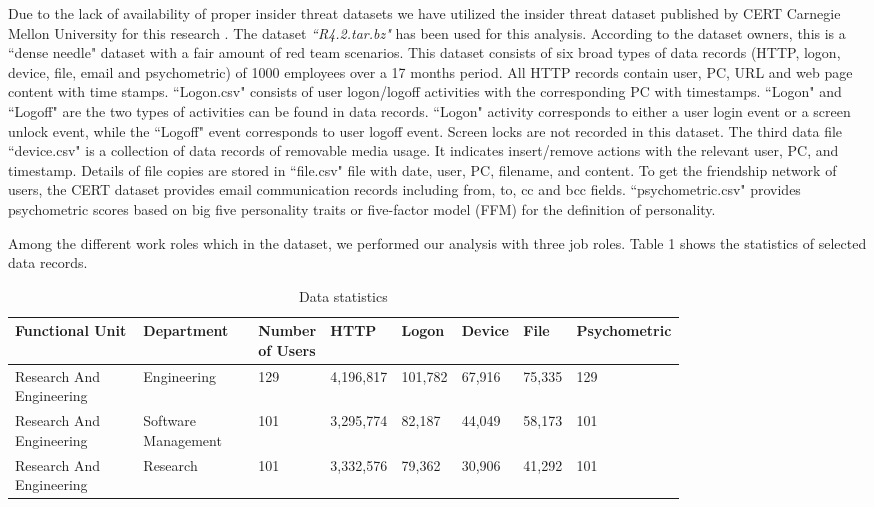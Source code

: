 \documentclass[conference,draftclsnofoot,onecolumn]{IEEEtran}%
\begin{document}
Due to the lack of availability of proper insider threat datasets we have utilized the insider threat dataset published by CERT Carnegie Mellon University for this research \cite{CERTDataset}. The dataset \textit{``R4.2.tar.bz"} has been used for this analysis. According to the dataset owners, this is a ``dense needle" dataset with a fair amount of red team scenarios. This dataset consists of six broad types of data records (HTTP, logon, device, file, email and psychometric) of 1000 employees over a 17 months period. All HTTP records contain user, PC, URL and web page content with time stamps. ``Logon.csv" consists of user logon/logoff activities with the corresponding PC with timestamps. ``Logon" and ``Logoff" are the two types of activities can be found in data records. ``Logon" activity corresponds to either a user login event or a screen unlock event, while the ``Logoff" event corresponds to user logoff event. Screen locks are not recorded in this dataset. The third data file ``device.csv" is a collection of data records of removable media usage. It indicates insert/remove actions with the relevant user, PC, and timestamp. Details of file copies are stored in ``file.csv" file with date, user, PC, filename, and content. To get the friendship network of users, the CERT dataset provides email communication records including from, to, cc and bcc fields. ``psychometric.csv" provides psychometric scores based on big five personality traits or five-factor model (FFM) for the definition of personality. 

Among the different work roles which in the dataset, we performed our analysis with three job roles. Table 1 shows the statistics of selected data records.

\renewcommand{\arraystretch}{1.2} 
\begin{table*}[h]
\caption{Data statistics}
\centering
\begin{tabular}{|p{0.19\linewidth}|p{0.17\linewidth}|p{0.06\linewidth}|p{0.07\linewidth}|p{0.07\linewidth}|p{0.07\linewidth}|p{0.07\linewidth}|p{0.08\linewidth}|}
\hline Functional Unit & Department & Number of Users & HTTP  & Logon & Device & File & Psychometric\\
\hline  Research And Engineering & Engineering & 129 & 4,196,817 & 101,782 & 67,916 & 75,335 & 129 \\
\hline  Research And Engineering & Software Management & 101 & 3,295,774	& 82,187  & 44,049 & 58,173 & 101 \\
\hline  Research And Engineering & Research & 101 & 3,332,576 & 79,362 & 30,906  & 41,292 & 101 \\
\hline 
\end{tabular}
\vspace{-5pt}
\end{table*}
\end{document}
